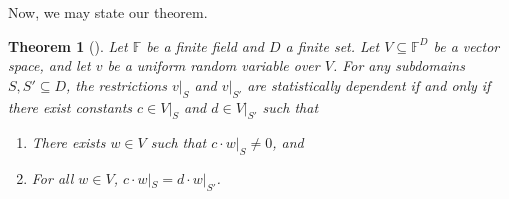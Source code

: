 \documentclass[english,12pt]{reedthesis}
\theoremstyle{plain}
\newtheorem{thm}{Theorem}[section]
\theoremstyle{definition}
\theoremstyle{remark}
\begin{document}
Now, we may state our theorem.

\begin{thm}[{\cite[Claim 2]{CFGS22}}]\label{thm:lin-indep-stat-indep}
  Let $\mathbb{F}$ be a finite field and $D$ a finite set. Let
  $V \subseteq \mathbb{F}^{D}$ be a vector space, and let $v$ be a uniform random
  variable over $V$. For any subdomains $S, S' \subseteq D$, the restrictions $v|_{S}$
  and $v|_{S'}$ are statistically dependent if and only if there exist constants
  $c \in V|_{S}$ and $d \in V|_{S'}$ such that
  \begin{enumerate}
    \item There exists $w \in V$ such that $c \cdot w|_{S} \ne 0$, and
    \item For all $w \in V$, $c \cdot w|_{S} = d \cdot w|_{S'}$.
  \end{enumerate}
\end{thm}
\end{document}

